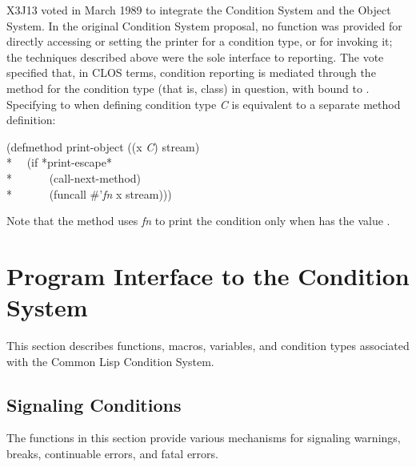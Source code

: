 X3J13 voted in March 1989  to integrate the
Condition System and the Object System.
In the original Condition System proposal,
no function was provided for directly accessing or setting the printer for
a condition type, or for invoking it; the techniques described above were
the sole interface to reporting.  The vote specified that, in CLOS terms,
condition reporting is mediated through the 
method for the condition type (that is, class) in question, with 
bound to .  Specifying  to
 when defining
condition type {\it C} is equivalent to a separate method definition:
\begin{lisp}
(defmethod print-object ((x {\it C}) stream) \\*
~~(if *print-escape* \\*
~~~~~~(call-next-method) \\*
~~~~~~(funcall \#'{\it fn} x stream)))
\end{lisp}
Note that the method uses {\it fn} to print the condition
only when  has the value .



\section{Program Interface to the Condition System}

This section describes functions, macros, variables, and condition
types associated with the Common Lisp Condition System.


\subsection{Signaling Conditions}
\label{SIGNALLING-CONDITIONS}


The functions in this section provide various mechanisms
for signaling warnings, breaks, continuable errors, and fatal errors.


